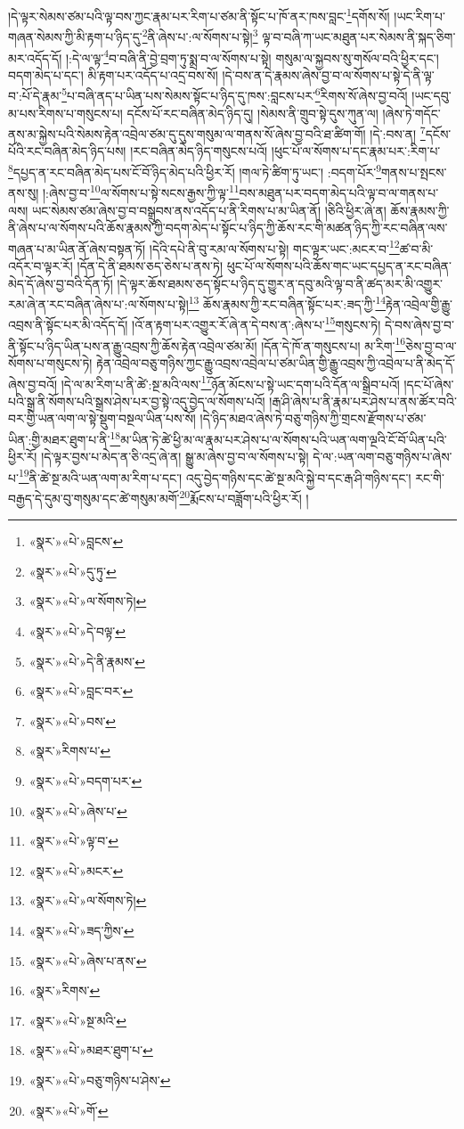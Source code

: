 །དེ་ལྟར་སེམས་ཙམ་པའི་ལྟ་བས་ཀྱང་རྣམ་པར་རིག་པ་ཙམ་ནི་སྟོང་པ་ཁོ་ནར་ཁས་བླང་\footnote{«སྣར་»«པེ་»བླངས་}དགོས་སོ། །ཡང་རིག་པ་གཞན་སེམས་ཀྱི་མི་རྟག་པ་ཉིད་དུ་\footnote{«སྣར་»«པེ་»དུ་ཏུ་}ནི་ཞེས་པ་:ལ་སོགས་པ་སྟེ།\footnote{«སྣར་»«པེ་»ལ་སོགས་ཏེ།} ལྟ་བ་བཞི་ཀ་ཡང་མཐུན་པར་སེམས་ནི་སྐད་ཅིག་མར་འདོད་དོ། །:དེ་ལ་ལྟ་\footnote{«སྣར་»«པེ་»དེ་བལྟ་}བ་བཞི་ནི་བྱེ་བྲག་ཏུ་སྨྲ་བ་ལ་སོགས་པ་སྟེ། གསུམ་ལ་སྐྱབས་སུ་གསོལ་བའི་ཕྱིར་དང་། བདག་མེད་པ་དང་། མི་རྟག་པར་འདོད་པ་འདྲ་བས་སོ། །དེ་བས་ན་དེ་རྣམས་ཞེས་བྱ་བ་ལ་སོགས་པ་སྟེ་དེ་ནི་ལྟ་བ་:པོ་དེ་རྣམ་\footnote{«སྣར་»«པེ་»དེ་ནི་རྣམས་}པ་བཞི་ནད་པ་ཡིན་པས་སེམས་སྟོང་པ་ཉིད་དུ་ཁས་:བླངས་པར་\footnote{«སྣར་»«པེ་»བླང་བར་}རིགས་སོ་ཞེས་བྱ་བའོ། །ཡང་དབུ་མ་པས་རིགས་པ་གསུངས་པ། དངོས་པོ་རང་བཞིན་མེད་ཉིད་དུ། །སེམས་ནི་གྲུབ་སྟེ་དུས་ཀུན་ལ། །ཞེས་ཏེ་གདོང་ནས་མ་སྐྱེས་པའི་སེམས་རྟེན་འབྲེལ་ཙམ་དུ་དུས་གསུམ་ལ་གནས་སོ་ཞེས་བྱ་བའི་ཐ་ཚིག་གོ། །དེ་:བས་ན། \footnote{«སྣར་»«པེ་»བས་}དངོས་པོའི་རང་བཞིན་མེད་ཉིད་པས། །རང་བཞིན་མེད་ཉིད་གསུངས་པའོ། །ཕུང་པོ་ལ་སོགས་པ་དང་རྣམ་པར་:རིག་པ་\footnote{«སྣར་»རིགས་པ་}དཔྱད་ན་རང་བཞིན་མེད་པས་ངོ་བོ་ཉིད་མེད་པའི་ཕྱིར་རོ། །གལ་ཏེ་ཚིག་ཏུ་ཡང་། :བདག་པོར་\footnote{«སྣར་»«པེ་»བདག་པར་}གནས་པ་སྤངས་ནས་སུ། །:ཞེས་བྱ་བ་\footnote{«སྣར་»«པེ་»ཞེས་པ་}ལ་སོགས་པ་སྟེ་སངས་རྒྱས་ཀྱི་ལྟ་\footnote{«སྣར་»«པེ་»ལྟ་བ་}བས་མཐུན་པར་བདག་མེད་པའི་ལྟ་བ་ལ་གནས་པ་ལས། ཡང་སེམས་ཙམ་ཞེས་བྱ་བ་བསྒྲུབས་ནས་འདོད་པ་ནི་རིགས་པ་མ་ཡིན་ནོ། །ཅིའི་ཕྱིར་ཞེ་ན། ཆོས་རྣམས་ཀྱི་ནི་ཞེས་པ་ལ་སོགས་པའི་ཆོས་རྣམས་ཀྱི་བདག་མེད་པ་སྟོང་པ་ཉིད་ཀྱི་ཆོས་རང་གི་མཚན་ཉིད་ཀྱི་རང་བཞིན་ལས་གཞན་པ་མ་ཡིན་ནོ་ཞེས་བསྟན་ཏོ། །དེའི་དཔེ་ནི་བུ་རམ་ལ་སོགས་པ་སྟེ། གང་ལྟར་ཡང་:མངར་བ་\footnote{«སྣར་»«པེ་»མངར་}ཚ་བ་མི་འདོར་བ་ལྟར་རོ། །དོན་དེ་ནི་ཐམས་ཅད་ཅེས་པ་ནས་ཏེ། ཕུང་པོ་ལ་སོགས་པའི་ཆོས་གང་ཡང་དཔྱད་ན་རང་བཞིན་མེད་དོ་ཞེས་བྱ་བའི་དོན་ཏོ། །དེ་ལྟར་ཆོས་ཐམས་ཅད་སྟོང་པ་ཉིད་དུ་གྱུར་ན་དབུ་མའི་ལྟ་བ་ནི་ཚད་མར་མི་འགྱུར་རམ་ཞེ་ན་རང་བཞིན་ཞེས་པ་:ལ་སོགས་པ་སྟེ།\footnote{«སྣར་»«པེ་»ལ་སོགས་ཏེ།} ཆོས་རྣམས་ཀྱི་རང་བཞིན་སྟོང་པར་:ཟད་ཀྱི་\footnote{«སྣར་»«པེ་»ཟད་ཀྱིས་}རྟེན་འབྲེལ་གྱི་རྒྱུ་འབྲས་ནི་སྟོང་པར་མི་འདོད་དོ། །འོ་ན་རྟག་པར་འགྱུར་རོ་ཞེ་ན་དེ་བས་ན་:ཞེས་པ་\footnote{«སྣར་»«པེ་»ཞེས་པ་ནས་}གསུངས་ཏེ། དེ་བས་ཞེས་བྱ་བ་ནི་སྟོང་པ་ཉིད་ཡིན་པས་ན་རྒྱུ་འབྲས་ཀྱི་ཆོས་རྟེན་འབྲེལ་ཙམ་མོ། །དོན་དེ་ཁོ་ན་གསུངས་པ། མ་རིག་\footnote{«སྣར་»རིགས་}ཅེས་བྱ་བ་ལ་སོགས་པ་གསུངས་ཏེ། རྟེན་འབྲེལ་བཅུ་གཉིས་ཀྱང་རྒྱུ་འབྲས་འབྲེལ་པ་ཙམ་ཡིན་གྱི་རྒྱུ་འབྲས་ཀྱི་འབྲེལ་པ་ནི་མེད་དོ་ཞེས་བྱ་བའོ། །དེ་ལ་མ་རིག་པ་ནི་ཚེ་:སྔ་མའི་ལས་\footnote{«སྣར་»«པེ་»སྔ་མའི་}ཉོན་མོངས་པ་སྟེ་ཡང་དག་པའི་དོན་ལ་སྒྲིབ་པའོ། །དང་པོ་ཞེས་པའི་སྒྲ་ནི་སོགས་པའི་སྒྲས་ཤེས་པར་བྱ་སྟེ་འདུ་བྱེད་ལ་སོགས་པའོ། །རྒ་ཤི་ཞེས་པ་ནི་རྣམ་པར་ཤེས་པ་ནས་ཚོར་བའི་བར་གྱི་ཡན་ལག་ལ་སྟེ་སྡུག་བསྔལ་ཡིན་པས་སོ། །དེ་ཉིད་མཐའ་ཞེས་ཏེ་བཅུ་གཉིས་ཀྱི་གྲངས་རྫོགས་པ་ཙམ་ཡིན་:གྱི་མཐར་ཐུག་པ་ནི་\footnote{«སྣར་»«པེ་»མཐར་ཐུག་པ་}མ་ཡིན་ཏེ་ཚེ་ཕྱི་མ་ལ་རྣམ་པར་ཤེས་པ་ལ་སོགས་པའི་ཡན་ལག་ལྔའི་ངོ་བོ་ཡིན་པའི་ཕྱིར་རོ། །དེ་ལྟར་བྱས་པ་མེད་ན་ཅི་འདྲ་ཞེ་ན། སྒྱུ་མ་ཞེས་བྱ་བ་ལ་སོགས་པ་སྟེ། དེ་ལ་:ཡན་ལག་བཅུ་གཉིས་པ་ཞེས་པ་\footnote{«སྣར་»«པེ་»བཅུ་གཉིས་པ་ཤེས་}ནི་ཚེ་སྔ་མའི་ཡན་ལག་མ་རིག་པ་དང་། འདུ་བྱེད་གཉིས་དང་ཚེ་སྔ་མའི་སྐྱེ་བ་དང་རྒ་ཤི་གཉིས་དང་། རང་གི་བརྒྱད་དེ་དུམ་བུ་གསུམ་དང་ཚེ་གསུམ་མགོ་\footnote{«སྣར་»«པེ་»གོ་}རྨོངས་པ་བཟློག་པའི་ཕྱིར་རོ། །
